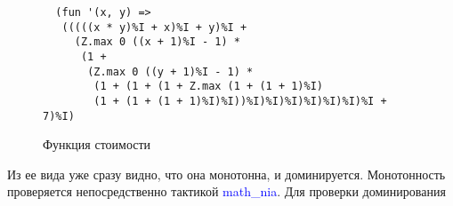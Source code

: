\begin{figure}[H]
  \caption{Функция стоимости}
  \label{code:cost_function}
  \begin{verbatim}
  (fun '(x, y) =>
   (((((x * y)%I + x)%I + y)%I +
     (Z.max 0 ((x + 1)%I - 1) *
      (1 +
       (Z.max 0 ((y + 1)%I - 1) *
        (1 + (1 + (1 + Z.max (1 + (1 + 1)%I) 
        (1 + (1 + (1 + 1)%I)%I))%I)%I)%I)%I)%I)%I)%I + 7)%I)
  \end{verbatim}
\end{figure}

Из ее вида уже сразу видно, что она монотонна, и доминируется. Монотонность проверяется непосредственно тактикой \textcolor{blue}{math\_nia}.
Для проверки доминирования